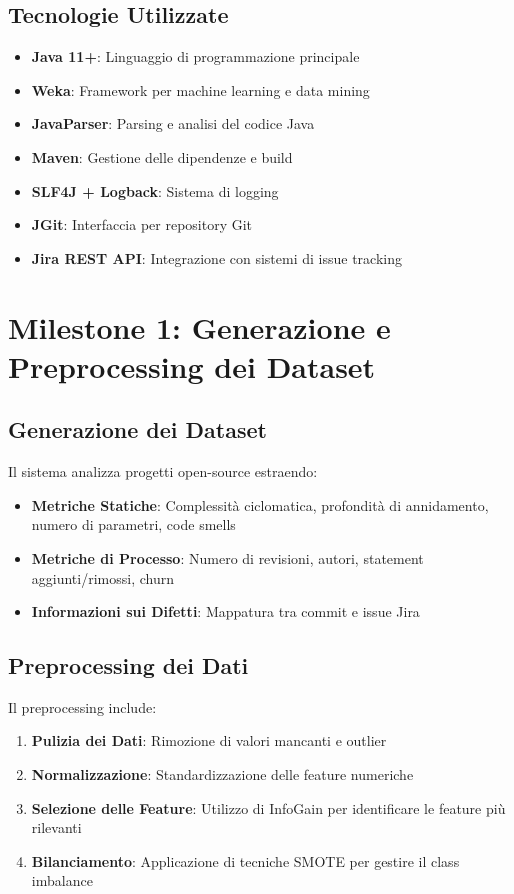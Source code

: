 \documentclass[12pt,a4paper]{article}
\begin{document}
\subsection{Tecnologie Utilizzate}

\begin{itemize}
    \item \textbf{Java 11+}: Linguaggio di programmazione principale
    \item \textbf{Weka}: Framework per machine learning e data mining
    \item \textbf{JavaParser}: Parsing e analisi del codice Java
    \item \textbf{Maven}: Gestione delle dipendenze e build
    \item \textbf{SLF4J + Logback}: Sistema di logging
    \item \textbf{JGit}: Interfaccia per repository Git
    \item \textbf{Jira REST API}: Integrazione con sistemi di issue tracking
\end{itemize}

\section{Milestone 1: Generazione e Preprocessing dei Dataset}

\subsection{Generazione dei Dataset}

Il sistema analizza progetti open-source estraendo:

\begin{itemize}
    \item \textbf{Metriche Statiche}: Complessità ciclomatica, profondità di annidamento, numero di parametri, code smells
    \item \textbf{Metriche di Processo}: Numero di revisioni, autori, statement aggiunti/rimossi, churn
    \item \textbf{Informazioni sui Difetti}: Mappatura tra commit e issue Jira
\end{itemize}

\subsection{Preprocessing dei Dati}

Il preprocessing include:

\begin{enumerate}
    \item \textbf{Pulizia dei Dati}: Rimozione di valori mancanti e outlier
    \item \textbf{Normalizzazione}: Standardizzazione delle feature numeriche
    \item \textbf{Selezione delle Feature}: Utilizzo di InfoGain per identificare le feature più rilevanti
    \item \textbf{Bilanciamento}: Applicazione di tecniche SMOTE per gestire il class imbalance
\end{enumerate}
\end{document}
